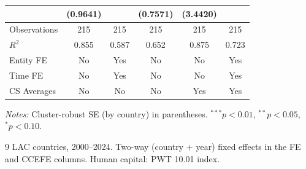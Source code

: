 \begin{table}[htbp]
\begin{tabular}{lccccc}
 & (0.9641) &  & (0.7571) & (3.4420) &  \\[2pt]
\midrule
Observations & 215 & 215 & 215 & 215 & 215 \\
$R^2$ & 0.855 & 0.587 & 0.652 & 0.875 & 0.723 \\
Entity FE & No & Yes & No & No & Yes \\
Time FE & No & Yes & No & No & Yes \\
CS Averages & No & No & No & Yes & Yes \\
\bottomrule
\end{tabular}
\begin{tablenotes}
\footnotesize
\item \textit{Notes:} Cluster-robust SE (by country) in parentheses. $^{***}p<0.01$, $^{**}p<0.05$, $^{*}p<0.10$.
\item 9 LAC countries, 2000--2024. Two-way (country + year) fixed effects in the FE and CCEFE columns. Human capital: PWT 10.01 index.
\end{tablenotes}
\end{table}